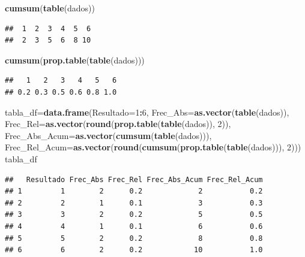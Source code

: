 \documentclass[]{book}
\newenvironment{Shaded}{\begin{snugshade}}{\end{snugshade}}
\newcommand{\DataTypeTok}[1]{\textcolor[rgb]{0.13,0.29,0.53}{#1}}
\newcommand{\DecValTok}[1]{\textcolor[rgb]{0.00,0.00,0.81}{#1}}
\newcommand{\KeywordTok}[1]{\textcolor[rgb]{0.13,0.29,0.53}{\textbf{#1}}}
\newcommand{\NormalTok}[1]{#1}
\newcommand{\OperatorTok}[1]{\textcolor[rgb]{0.81,0.36,0.00}{\textbf{#1}}}
\theoremstyle{definition}
\theoremstyle{definition}
\theoremstyle{definition}
\theoremstyle{remark}
\begin{document}
\begin{Shaded}
\begin{Highlighting}[]
\KeywordTok{cumsum}\NormalTok{(}\KeywordTok{table}\NormalTok{(dados))}
\end{Highlighting}
\end{Shaded}

\begin{verbatim}
##  1  2  3  4  5  6 
##  2  3  5  6  8 10
\end{verbatim}

\begin{Shaded}
\begin{Highlighting}[]
\KeywordTok{cumsum}\NormalTok{(}\KeywordTok{prop.table}\NormalTok{(}\KeywordTok{table}\NormalTok{(dados)))}
\end{Highlighting}
\end{Shaded}

\begin{verbatim}
##   1   2   3   4   5   6 
## 0.2 0.3 0.5 0.6 0.8 1.0
\end{verbatim}

\begin{Shaded}
\begin{Highlighting}[]
\NormalTok{tabla_df=}\KeywordTok{data.frame}\NormalTok{(}\DataTypeTok{Resultado=}\DecValTok{1}\OperatorTok{:}\DecValTok{6}\NormalTok{, }
  \DataTypeTok{Frec_Abs=}\KeywordTok{as.vector}\NormalTok{(}\KeywordTok{table}\NormalTok{(dados)), }
  \DataTypeTok{Frec_Rel=}\KeywordTok{as.vector}\NormalTok{(}\KeywordTok{round}\NormalTok{(}\KeywordTok{prop.table}\NormalTok{(}\KeywordTok{table}\NormalTok{(dados)), }\DecValTok{2}\NormalTok{)), }
  \DataTypeTok{Frec_Abs_Acum=}\KeywordTok{as.vector}\NormalTok{(}\KeywordTok{cumsum}\NormalTok{(}\KeywordTok{table}\NormalTok{(dados))), }
  \DataTypeTok{Frec_Rel_Acum=}\KeywordTok{as.vector}\NormalTok{(}\KeywordTok{round}\NormalTok{(}\KeywordTok{cumsum}\NormalTok{(}\KeywordTok{prop.table}\NormalTok{(}\KeywordTok{table}\NormalTok{(dados))), }\DecValTok{2}\NormalTok{)))}
\NormalTok{tabla_df}
\end{Highlighting}
\end{Shaded}

\begin{verbatim}
##   Resultado Frec_Abs Frec_Rel Frec_Abs_Acum Frec_Rel_Acum
## 1         1        2      0.2             2           0.2
## 2         2        1      0.1             3           0.3
## 3         3        2      0.2             5           0.5
## 4         4        1      0.1             6           0.6
## 5         5        2      0.2             8           0.8
## 6         6        2      0.2            10           1.0
\end{verbatim}
\end{document}
